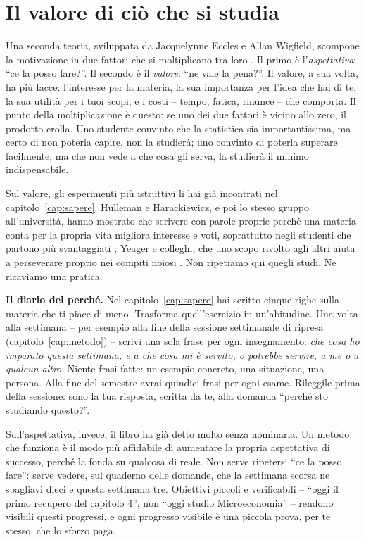 \section{Il valore di ciò che si studia}

Una seconda teoria, sviluppata da Jacquelynne Eccles e Allan Wigfield,
scompone la motivazione in due fattori che si moltiplicano tra loro
\parencite{wigfield2000}. Il primo è l'\emph{aspettativa}: \enquote{ce
la posso fare?}. Il secondo è il \emph{valore}: \enquote{ne vale la
pena?}. Il valore, a sua volta, ha più facce: l'interesse per la
materia, la sua importanza per l'idea che hai di te, la sua utilità
per i tuoi scopi, e i costi -- tempo, fatica, rinunce -- che comporta.
Il punto della moltiplicazione è questo: se uno dei due fattori è
vicino allo zero, il prodotto crolla. Uno studente convinto che la
statistica sia importantissima, ma certo di non poterla capire, non la
studierà; uno convinto di poterla superare facilmente, ma che non vede
a che cosa gli serva, la studierà il minimo indispensabile.

Sul valore, gli esperimenti più istruttivi li hai già incontrati nel
capitolo~\ref{cap:sapere}. Hulleman e Harackiewicz, e poi lo stesso
gruppo all'università, hanno mostrato che scrivere con parole proprie
perché una materia conta per la propria vita migliora interesse e
voti, soprattutto negli studenti che partono più svantaggiati
\parencite{hulleman2009, harackiewicz2016}; Yeager e colleghi, che uno
scopo rivolto agli altri aiuta a perseverare proprio nei compiti noiosi
\parencite{yeager2014}. Non ripetiamo qui quegli studi. Ne ricaviamo
una pratica.

\begin{esercizio}
\textbf{Il diario del perché.} Nel capitolo~\ref{cap:sapere} hai
scritto cinque righe sulla materia che ti piace di meno. Trasforma
quell'esercizio in un'abitudine. Una volta alla settimana -- per
esempio alla fine della sessione settimanale di ripresa
(capitolo~\ref{cap:metodo}) -- scrivi una sola frase per ogni
insegnamento: \emph{che cosa ho imparato questa settimana, e a che
cosa mi è servito, o potrebbe servire, a me o a qualcun altro}. Niente
frasi fatte: un esempio concreto, una situazione, una persona. Alla
fine del semestre avrai quindici frasi per ogni esame. Rileggile prima
della sessione: sono la tua risposta, scritta da te, alla domanda
\enquote{perché sto studiando questo?}.
\end{esercizio}

Sull'aspettativa, invece, il libro ha già detto molto senza nominarla.
Un metodo che funziona è il modo più affidabile di aumentare la
propria aspettativa di successo, perché la fonda su qualcosa di reale.
Non serve ripetersi \enquote{ce la posso fare}: serve vedere, sul
quaderno delle domande, che la settimana scorsa ne sbagliavi dieci e
questa settimana tre. Obiettivi piccoli e verificabili -- \enquote{oggi
il primo recupero del capitolo 4}, non \enquote{oggi studio
Microeconomia} -- rendono visibili questi progressi, e ogni progresso
visibile è una piccola prova, per te stesso, che lo sforzo paga.

